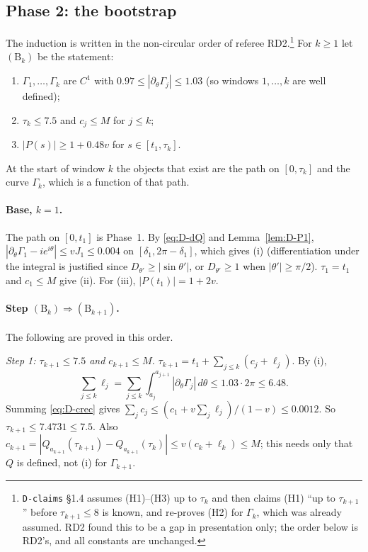 \subsection{Phase 2: the bootstrap}\label{sec:D1-bootstrap}
The induction is written in the non-circular order of referee RD2.\footnote{\texttt{D-claims} \S1.4 assumes (H1)--(H3) up to
$\tau_k$ and then claims (H1) ``up to $\tau_{k+1}$'' before $\tau_{k+1}\le8$ is known, and re-proves (H2) for $\Gamma_k$, which
was already assumed. RD2 found this to be a gap in presentation only; the order below is RD2's, and all constants are
unchanged.} For $k\ge1$ let $(\mathrm B_k)$ be the statement:
\begin{enumerate}
\item[(i)] $\Gamma_1,\dots,\Gamma_k$ are $C^1$ with $0.97\le|\partial_\theta\Gamma_j|\le1.03$ (so windows $1,\dots,k$ are well defined);
\item[(ii)] $\tau_k\le7.5$ and $c_j\le M$ for $j\le k$;
\item[(iii)] $|P(s)|\ge1+0.48v$ for $s\in[t_1,\tau_k]$.
\end{enumerate}
At the start of window $k$ the objects that exist are the path on $[0,\tau_k]$ and the curve $\Gamma_k$, which is a function
of that path.

\paragraph{Base, $k=1$.} The path on $[0,t_1]$ is Phase~1. By \eqref{eq:D-dQ} and Lemma~\ref{lem:D-P1},
$|\partial_\theta\Gamma_1-ie^{i\theta}|\le vJ_1\le0.004$ on $[\delta_1,2\pi-\delta_1]$, which gives (i) (differentiation under
the integral is justified since $D_{\theta'}\ge|\sin\theta'|$, or $D_{\theta'}\ge1$ when $|\theta'|\ge\pi/2$). $\tau_1=t_1$ and
$c_1\le M$ give (ii). For (iii), $|P(t_1)|=1+2v$.

\paragraph{Step $(\mathrm B_k)\Rightarrow(\mathrm B_{k+1})$.} The following are proved in this order.

\smallskip\noindent\emph{Step 1: $\tau_{k+1}\le7.5$ and $c_{k+1}\le M$.} $\tau_{k+1}=t_1+\sum_{j\le k}(c_j+\ell_j)$. By (i),
\[
\textstyle\sum_{j\le k}\ell_j=\sum_{j\le k}\int_{a_j}^{a_{j+1}}|\partial_\theta\Gamma_j|\,d\theta\le1.03\cdot2\pi\le6.48 .
\]
Summing
\eqref{eq:D-crec} gives $\sum_jc_j\le(c_1+v\sum_j\ell_j)/(1-v)\le0.0012$. So $\tau_{k+1}\le7.4731\le7.5$. Also
$c_{k+1}=|Q_{a_{k+1}}(\tau_{k+1})-Q_{a_{k+1}}(\tau_k)|\le v(c_k+\ell_k)\le M$; this needs only that $Q$ is defined, not (i)
for $\Gamma_{k+1}$.

